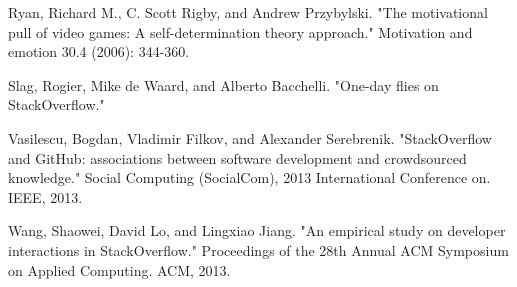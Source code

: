 \documentclass{sigchi}
\begin{document}
\begin{thebibliography}{9}
Ryan, Richard M., C. Scott Rigby, and Andrew Przybylski. "The motivational pull of video games: A self-determination theory approach." Motivation and emotion 30.4 (2006): 344-360.

Slag, Rogier, Mike de Waard, and Alberto Bacchelli. "One-day flies on StackOverflow."

Vasilescu, Bogdan, Vladimir Filkov, and Alexander Serebrenik. "StackOverflow and GitHub: associations between software development and crowdsourced knowledge." Social Computing (SocialCom), 2013 International Conference on. IEEE, 2013.

Wang, Shaowei, David Lo, and Lingxiao Jiang. "An empirical study on developer interactions in StackOverflow." Proceedings of the 28th Annual ACM Symposium on Applied Computing. ACM, 2013.


\end{thebibliography}
\end{document}
